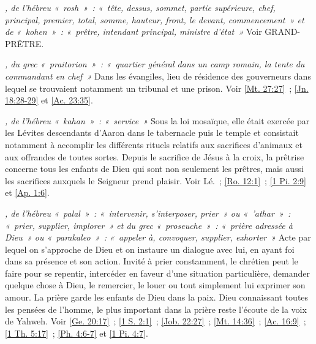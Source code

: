 \begin{multicols}{2}
\textit{, de l'hébreu «~rosh~»~: «~tête, dessus, sommet, partie supérieure, chef, principal, premier, total, somme, hauteur, front, le devant, commencement~» et de «~kohen~»~: «~prêtre, intendant principal, ministre d'état~»}\newline
Voir GRAND-PRÊTRE.

\textit{, du grec «~praitorion~»~: «~quartier général dans un camp romain, la tente du commandant en chef~»}\newline
Dans les évangiles, lieu de résidence des gouverneurs dans lequel se trouvaient notamment un tribunal et une prison. Voir \vref{Mt. 27:27}~; \vref{Jn. 18:28-29} et \vref{Ac. 23:35}.

\textit{, de l'hébreu «~kahan~»~: «~service~»}\newline
Sous la loi mosaïque, elle était exercée par les Lévites descendants d'Aaron dans le tabernacle puis le temple et consistait notamment à accomplir les différents rituels relatifs aux sacrifices d'animaux et aux offrandes de toutes sortes. Depuis le sacrifice de Jésus à la croix, la prêtrise concerne tous les enfants de Dieu qui sont non seulement les prêtres, mais aussi les sacrifices auxquels le Seigneur prend plaisir. Voir Lé.~; \vref{Ro. 12:1}~; \vref{1 Pi. 2:9} et \vref{Ap. 1:6}.

\textit{, de l'hébreu «~palal~»~: «~intervenir, s'interposer, prier~» ou «~'athar~»~: «~prier, supplier, implorer~» et du grec «~proseuche~»~: «~prière adressée à Dieu~» ou «~parakaleo~»~: «~appeler à, convoquer, supplier, exhorter~»}\newline
Acte par lequel on s'approche de Dieu et on instaure un dialogue avec lui, en ayant foi dans sa présence et son action. Invité à prier constamment, le chrétien peut le faire pour se repentir, intercéder en faveur d'une situation particulière, demander quelque chose à Dieu, le remercier, le louer ou tout simplement lui exprimer son amour. La prière garde les enfants de Dieu dans la paix. Dieu connaissant toutes les pensées de l'homme, le plus important dans la prière reste l'écoute de la voix de Yahweh. Voir \vref{Ge. 20:17}~; \vref{1 S. 2:1}~; \vref{Job. 22:27}~; \vref{Mt. 14:36}~; \vref{Ac. 16:9}~; \vref{1 Th. 5:17}~; \vref{Ph. 4:6-7} et \vref{1 Pi. 4:7}.


\end{multicols}
